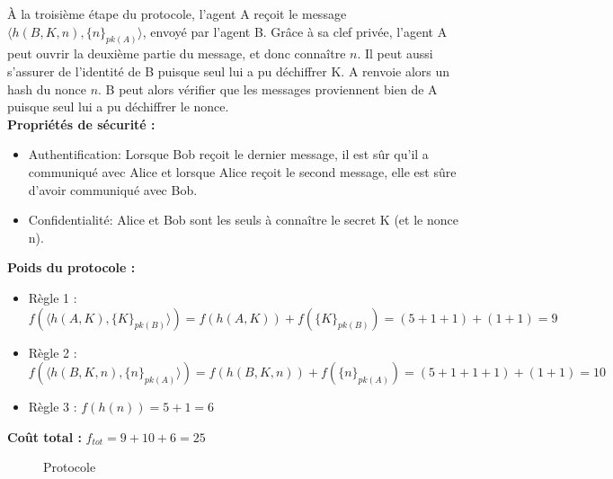 \documentclass[10pt,a4paper]{article}
\begin{document}
À la troisième étape du protocole, l'agent A reçoit le message $\langle h(B, K, n), \{n\}_{pk(A)} \rangle $, envoyé par l'agent B.
Grâce à sa clef privée, l'agent A peut ouvrir la deuxième partie du message, et donc connaître $n$.
Il peut aussi s'assurer de l'identité de B puisque seul lui a pu déchiffrer K.
A renvoie alors un hash du nonce $n$. B peut alors vérifier que les messages proviennent bien de A puisque seul lui a pu déchiffrer le nonce.\\


\textbf{Propriétés de sécurité :}
\begin{itemize}
 \item Authentification: Lorsque Bob reçoit le dernier message, il est sûr qu'il a communiqué avec Alice et lorsque Alice reçoit le second message, elle est sûre d'avoir communiqué avec Bob. 
 \item Confidentialité: Alice et Bob sont les seuls à connaître le secret K (et le nonce n).
\end{itemize}



\textbf{Poids du protocole :}
\begin{itemize}
\item Règle 1 : $f( \langle h(A, K), \{K\}_{pk(B)} \rangle ) = f ( h(A, K) ) + f ( \{K\}_{pk(B)} ) = (5 + 1 + 1) + (1 + 1) = 9 $
\item Règle 2 : $f(\langle h(B, K, n), \{n\}_{pk(A)} \rangle) = f(h(B, K, n)) + f(\{n\}_{pk(A)}) = (5 + 1 + 1 + 1) + (1 + 1) = 10 $
\item Règle 3 : $f(h(n)) = 5 + 1 = 6$
\end{itemize}

\textbf{Coût total :} $f_{tot} = 9 + 10 + 6 = 25$



\begin{figure}[!ht]
\centering
\begin{msc}{Protocole}
  \nextlevel
  \nextlevel[2]
  \nextlevel
  \nextlevel[2]
  \nextlevel
  \nextlevel
\end{msc}
\end{figure}




\end{document}
